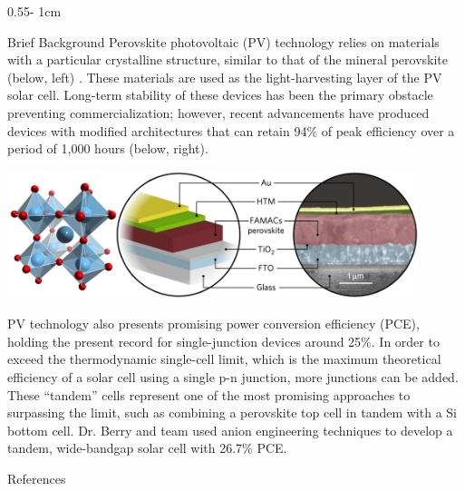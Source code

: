 \documentclass{../psuposter}
\begin{document}
\begin{frame}
\begin{columns}[t, totalwidth=\textwidth]
\begin{column}{0.55\textwidth - 1cm}
    \begin{block}{Brief Background}
        Perovskite photovoltaic (PV) technology relies on materials with a particular crystalline structure, similar to that of the mineral perovskite (below, left) \cite{luPerovskiteSolarCells}. These materials are used as the light-harvesting layer of the PV solar cell. Long-term stability of these devices has been the primary obstacle preventing commercialization; however, recent advancements have produced devices with modified architectures that can retain 94\% of peak efficiency over a period of 1,000 hours (below, right). \cite{christiansTailoredInterfacesUnencapsulated2018}
		
        \begin{center}
		   	\includegraphics[width=0.9\textwidth]{images/solar-cell}    		
    	\end{center}

		PV technology also presents promising power conversion efficiency (PCE), holding the present record for single-junction devices around 25\%. In order to exceed the thermodynamic single-cell limit, which is the maximum theoretical efficiency of a solar cell using a single p-n junction, more junctions can be added. These ``tandem'' cells represent one of the most promising approaches to surpassing the limit, such as combining a perovskite top cell in tandem with a Si bottom cell. Dr. Berry and team used anion engineering techniques to develop a tandem, wide-bandgap solar cell with 26.7\% PCE. \cite{kimEfficientStableSilicon2020} 

    \end{block}


    \begin{block}{References}
        
%        
		
    \end{block}


\end{column}
\end{columns}
\end{frame}
\end{document}
